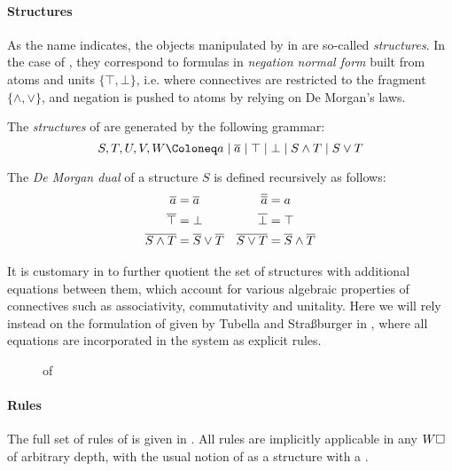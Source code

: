 \begin{scope}
\begin{scope}
\paragraph{Structures}

As the name indicates, the objects manipulated by  in  are so-called \emph{structures}. In the case of , they
correspond to formulas in \emph{negation normal form} built from atoms and units
$\{\top, \bot\}$, i.e. where connectives are restricted to the fragment
$\{\land, \lor\}$, and negation is pushed to atoms by relying on De Morgan's
laws.

\begin{definition}[Structure]
  The \emph{structures} of  are generated by the following grammar:
  $$S, T, U, V, W \Coloneq a \mid \dmdual{a} \mid \top \mid \bot \mid S \land T
  \mid S \lor T$$
\end{definition}

\begin{definition}
  The \emph{De Morgan dual} of a structure $S$ is defined recursively as
  follows:
  \begin{align*}
    \overline{a} &= \overline{a} & \overline{\overline{a}} &= a \\
    \overline{\top} &= \bot & \overline{\bot} &= \top \\
    \overline{S \land T} &= \overline{S} \lor \overline{T} & \overline{S \lor T} &= \overline{S} \land \overline{T}
  \end{align*}
\end{definition}

It is customary in  to further quotient the set of structures with additional
equations between them, which account for various algebraic properties of
connectives such as associativity, commutativity and unitality. Here we will
rely instead on the formulation of  given by Tubella and Straßburger in
\cite{tubella:hal-02390267}, where all equations are incorporated in the system
as explicit rules.

\begin{figure*}
  
  \caption{ of }
\end{figure*}

\paragraph{Rules}

The full set of rules of  is given in . All rules are
implicitly applicable in any \emph{} $W\square$ of arbitrary depth, with
the usual notion of  as a structure with a .


\end{scope}
\end{scope}
